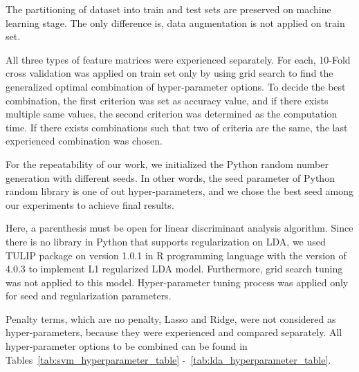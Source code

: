 The partitioning of dataset into train and test sets are preserved on machine learning stage. The only difference is, data augmentation is not applied on train set. 

All three types of feature matrices were experienced separately. For each, 10-Fold cross validation was applied on train set only by using grid search to find the generalized optimal combination of hyper-parameter options. To decide the best combination, the first criterion was set as accuracy value, and if there exists multiple same values, the second criterion was determined as the computation time. If there exists combinations such that two of criteria are the same, the last experienced combination was chosen. 

For the repeatability of our work, we initialized the Python random number generation with different seeds. In other words, the seed parameter of Python random library is one of out hyper-parameters, and we chose the best seed among our experiments to achieve final results.

Here, a parenthesis must be open for linear discriminant analysis algorithm. Since there is no library in Python that supports regularization on LDA, we used TULIP package \cite{TULIP_package} on version 1.0.1 in R programming language with the version of 4.0.3 to implement L1 regularized LDA model. Furthermore, grid search tuning was not applied to this model. Hyper-parameter tuning process was applied only for seed and regularization parameters.

Penalty terms, which are no penalty, Lasso and Ridge, were not considered as hyper-parameters, because they were experienced and compared separately. All hyper-parameter options to be combined can be found in Tables~\ref{tab:svm_hyperparameter_table} -~\ref{tab:lda_hyperparameter_table}.

